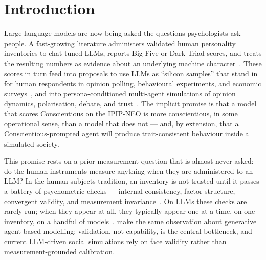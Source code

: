 \documentclass[11pt]{article}
\begin{document}
\section{Introduction}
\label{sec:intro}

Large language models are now being asked the questions psychologists ask people. A fast-growing literature administers validated human personality inventories to chat-tuned LLMs, reports Big Five or Dark Triad scores, and treats the resulting numbers as evidence about an underlying machine character~\citep{miotto2023gpt3,serapio2025psychometric,jiang2023personallm,huang2023psychobench,bodroza2024personality}. These scores in turn feed into proposals to use LLMs as ``silicon samples'' that stand in for human respondents in opinion polling, behavioural experiments, and economic surveys~\citep{argyle2023one,horton2023homo,aher2023using,park2023generative,ferreira2025matching}, and into persona-conditioned multi-agent simulations of opinion dynamics, polarisation, debate, and trust~\citep{chuang2023simulating,cau2025language,chuang2025debate,mannekote2025roleplaying}. The implicit promise is that a model that scores Conscientious on the IPIP-NEO is more conscientious, in some operational sense, than a model that does not --- and, by extension, that a Conscientious-prompted agent will produce trait-consistent behaviour inside a simulated society.

This promise rests on a prior measurement question that is almost never asked: do the human instruments measure anything when they are administered to an LLM? In the human-subjects tradition, an inventory is not trusted until it passes a battery of psychometric checks --- internal consistency, factor structure, convergent validity, and measurement invariance~\citep{cronbach1951coefficient,kaiser1960application,vandenberg2000review}. On LLMs these checks are rarely run; when they appear at all, they typically appear one at a time, on one inventory, on a handful of models~\citep{suhr2025challenging,pelet2025persistent,schaekermann2024personality}. \citet{larooij2025validation} make the same observation about generative agent-based modelling: validation, not capability, is the central bottleneck, and current LLM-driven social simulations rely on face validity rather than measurement-grounded calibration.
\end{document}

